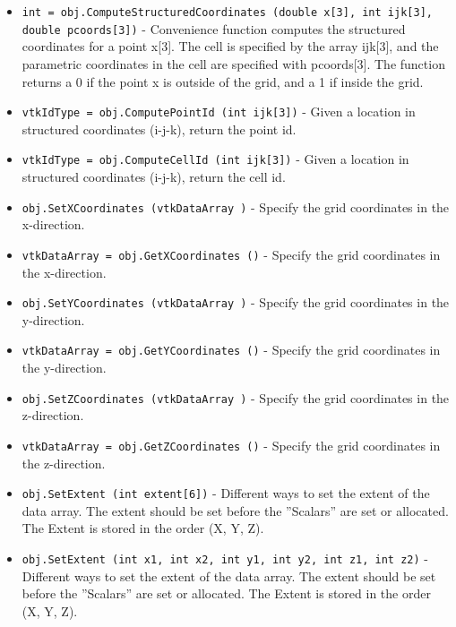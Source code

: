 \begin{itemize}
\item  \verb|int = obj.ComputeStructuredCoordinates (double x[3], int ijk[3], double pcoords[3])| -  Convenience function computes the structured coordinates for a point x[3].
 The cell is specified by the array ijk[3], and the parametric coordinates
 in the cell are specified with pcoords[3]. The function returns a 0 if the
 point x is outside of the grid, and a 1 if inside the grid.

\item  \verb|vtkIdType = obj.ComputePointId (int ijk[3])| -  Given a location in structured coordinates (i-j-k), return the point id.

\item  \verb|vtkIdType = obj.ComputeCellId (int ijk[3])| -  Given a location in structured coordinates (i-j-k), return the cell id.

\item  \verb|obj.SetXCoordinates (vtkDataArray )| -  Specify the grid coordinates in the x-direction.

\item  \verb|vtkDataArray = obj.GetXCoordinates ()| -  Specify the grid coordinates in the x-direction.

\item  \verb|obj.SetYCoordinates (vtkDataArray )| -  Specify the grid coordinates in the y-direction.

\item  \verb|vtkDataArray = obj.GetYCoordinates ()| -  Specify the grid coordinates in the y-direction.

\item  \verb|obj.SetZCoordinates (vtkDataArray )| -  Specify the grid coordinates in the z-direction.

\item  \verb|vtkDataArray = obj.GetZCoordinates ()| -  Specify the grid coordinates in the z-direction.

\item  \verb|obj.SetExtent (int extent[6])| -  Different ways to set the extent of the data array.  The extent
 should be set before the ''Scalars'' are set or allocated.
 The Extent is stored  in the order (X, Y, Z).

\item  \verb|obj.SetExtent (int x1, int x2, int y1, int y2, int z1, int z2)| -  Different ways to set the extent of the data array.  The extent
 should be set before the ''Scalars'' are set or allocated.
 The Extent is stored  in the order (X, Y, Z).


\end{itemize}
